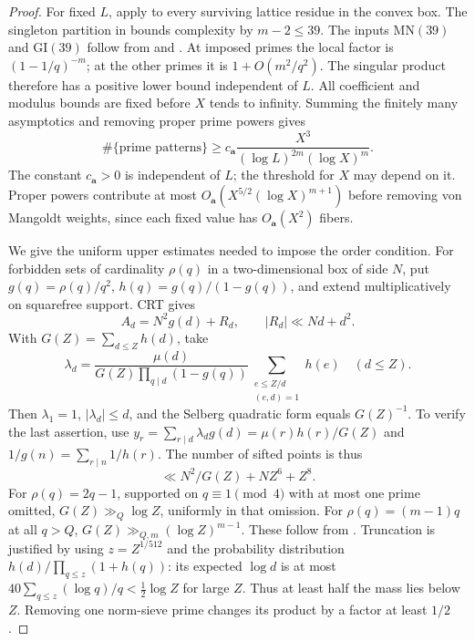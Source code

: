 \documentclass[11pt]{article}
\theoremstyle{definition}
\theoremstyle{remark}
\begin{document}
\begin{proof}
For fixed $L$, apply \cite[Main Theorem, p.~1763]{greentao} to every
surviving lattice residue in the convex box. The singleton partition
in \cite[Definition~1.5 and Lemma~1.6]{greentao} bounds complexity by
$m-2\le39$. The inputs $\mathrm{MN}(39)$ and $\mathrm{GI}(39)$ follow
from \cite[Theorem~1.1]{moebius} and \cite[Theorem~1.3]{gtz}.
At imposed primes the local factor is $(1-1/q)^{-m}$; at the other
primes it is $1+O(m^2/q^2)$. The singular product therefore has a
positive lower bound independent of $L$. All coefficient and modulus
bounds are fixed before $X$ tends to infinity. Summing the finitely
many asymptotics and removing proper prime powers gives
\begin{equation}\label{eq:old41-lower}
 \#\{\text{prime patterns}\}\ge
 c_{\mathbf a}\frac{X^3}{(\log L)^{2m}(\log X)^m}.
\end{equation}
The constant $c_{\mathbf a}>0$ is independent of $L$; the threshold
for $X$ may depend on it. Proper powers contribute at most
$O_{\mathbf a}(X^{5/2}(\log X)^{m+1})$ before removing von Mangoldt
weights, since each fixed value has $O_{\mathbf a}(X^2)$ fibers.

We give the uniform upper estimates needed to impose the order condition.
For forbidden sets of cardinality $\rho(q)$ in a two-dimensional box
of side $N$, put $g(q)=\rho(q)/q^2$, $h(q)=g(q)/(1-g(q))$, and extend
multiplicatively on squarefree support. CRT gives
\[
 A_d=N^2g(d)+R_d,\qquad |R_d|\ll Nd+d^2.
\]
With $G(Z)=\sum_{d\le Z}h(d)$, take
\[
 \lambda_d=\frac{\mu(d)}{G(Z)\prod_{q\mid d}(1-g(q))}
 \sum_{\substack{e\le Z/d\\(e,d)=1}}h(e)\quad(d\le Z).
\]
Then $\lambda_1=1$, $|\lambda_d|\le d$, and the Selberg quadratic
form equals $G(Z)^{-1}$. To verify the last assertion, use
$y_r=\sum_{r\mid d}\lambda_dg(d)=\mu(r)h(r)/G(Z)$ and
$1/g(n)=\sum_{r\mid n}1/h(r)$. The number of sifted points is thus
\begin{equation}\label{eq:old41-upper}
 \ll N^2/G(Z)+NZ^6+Z^8.
\end{equation}
For $\rho(q)=2q-1$, supported on $q\equiv1\pmod4$ with at most one
prime omitted, $G(Z)\gg_Q\log Z$, uniformly in that omission.
For $\rho(q)=(m-1)q$ at all $q>Q$,
$G(Z)\gg_{Q,m}(\log Z)^{m-1}$. These follow from
\cite[Theorem~1, moduli~4 and~2]{williams-mertens}. Truncation is
justified by using $z=Z^{1/512}$ and the probability distribution
$h(d)/\prod_{q\le z}(1+h(q))$: its expected $\log d$ is at most
$40\sum_{q\le z}(\log q)/q<\tfrac12\log Z$ for large $Z$.
Thus at least half the mass lies below $Z$. Removing one norm-sieve
prime changes its product by a factor at least $1/2$.


\end{proof}
\end{document}
